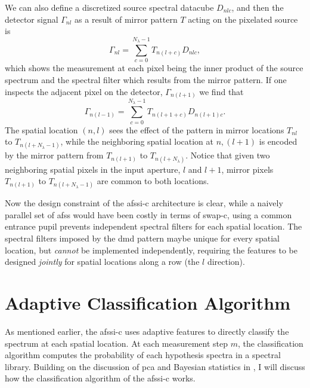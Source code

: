 We can also define a discretized source spectral datacube $D_{nlc}$, and then the detector signal $\Gamma_{nl}$ as a result of mirror pattern $T$ acting on the pixelated source is
%
%
\begin{equation}
	\Gamma_{nl} = \sum^{N_{\lambda}-1}_{c = 0} T_{n \left( l + c \right)} D_{nlc},
\end{equation}
%
%
which shows the measurement at each pixel being the inner product of the source spectrum and the spectral filter which results from the mirror pattern. If one inspects the adjacent pixel on the detector, $\Gamma_{n \left(l +1 \right)}$ we find that
%
%
\begin{equation}
\Gamma_{n\left(l-1\right)} = \sum^{N_{\lambda}-1}_{c = 0} T_{n\left( l + 1 + c \right)} D_{n\left(l+1\right)c}.
\end{equation}
%
%
The spatial location $\left(n,l \right)$ sees the effect of the pattern in mirror locations $T_{nl}$ to $T_{n\left(l+N_{\lambda}-1\right)}$, while the neighboring spatial location at $n, \left( l + 1\right)$ is encoded by the mirror pattern from $T_{n\left(l+1\right)}$ to $T_{n\left(l + N_{\lambda} \right)}$. Notice that given two neighboring spatial pixels in the input aperture, $l$ and $l+1$, mirror pixels $T_{n\left( l + 1 \right)}$ to $T_{n\left(l + N_{\lambda} - 1 \right)}$ are common to both locations. 

Now the design constraint of the \gls{afssi-c} architecture is clear, while a naively parallel set of \gls{afss} would have been costly in terms of \gls{swap-c}, using a common entrance pupil prevents independent spectral filters for each spatial location. The spectral filters imposed by the \gls{dmd} pattern maybe unique for every spatial location, but \textit{cannot} be implemented independently, requiring the features to be designed \textit{jointly} for spatial locations along a row (the $l$ direction).



\section{Adaptive Classification Algorithm}\label{sec:adaptiveClassficiationAlgo}

As mentioned earlier, the \gls{afssi-c} uses adaptive features to directly classify the spectrum at each spatial location. At each measurement step $m$, the classification algorithm computes the probability of each hypothesis spectra in a spectral library. Building on the discussion of \acrfull{pca} and Bayesian statistics in , I will discuss how the classification algorithm of the \gls{afssi-c} works. 


